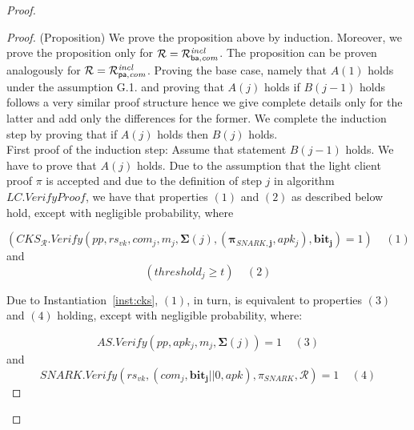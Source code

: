 \begin{proof}
\begin{proof}(Proposition) We prove the proposition above by induction. Moreover, we prove the proposition 
only for $ \mathcal{R} = \mathcal{R}^{\mathit{incl}}_{\mathsf{ba},\mathit{com}}$. The proposition can be proven analogously for $\mathcal{R} = \mathcal{R}^{\mathit{incl}}_{\mathsf{pa},\mathit{com}}$. 
Proving the base case, namely that $A(1)$ holds under the assumption G.1. and proving that $A(j)$ holds 
if $B(j-1)$ holds follows a very similar proof structure hence we give complete details only for the latter and add 
only the differences for the former. We complete the induction step by proving that if $A(j)$ holds then $B(j)$ holds. \\

\noindent First proof of the induction step: Assume that statement $B(j-1)$ holds. We have to prove that $A(j)$ holds. 
Due to the assumption that the light client proof $\pi$ is accepted and due to 
the definition of step $j$ in algorithm $\mathit{LC.VerifyProof}$, we have that properties 
$(1)$ and $(2)$ as described below hold, except with negligible probability, where

$$(\mathit{CKS}_{\mathcal{R}}.\mathit{Verify}(\mathit{pp},  \mathit{rs_{\mathit{vk}}}, \mathit{com_j}, m_j, 
 \mathbf{\Sigma}(j), (\mathbf{\pi_{\mathit{SNARK},j}}, \mathit{apk_j}), 
\mathbf{bit_j}) = 1) \ \ \ \ \  (1)$$ 
and
$$(\mathit{threshold_j} \geq t) \ \ \ \ \  (2)$$

\noindent Due to Instantiation~\ref{inst:cks}, $(1)$, in turn, is equivalent to properties $(3)$ and $(4)$ holding, 
except with negligible probability, where:

$$ \mathit{AS.Verify}(\mathit{pp}, \mathit{apk_j}, m_j, \mathbf{\Sigma}(j)) = 1 \ \ \ \ \  (3)$$ 
and
$$\mathit{SNARK.Verify}(\mathit{rs}_{\mathit{vk}}, (\mathit{com_j}, \mathbf{bit_{j}} || 0, \mathit{apk}), \pi_{\mathit{SNARK}}, \mathcal{R}) = 1 \ \ \ \ \  (4)$$ 


\end{proof}
\end{proof}
